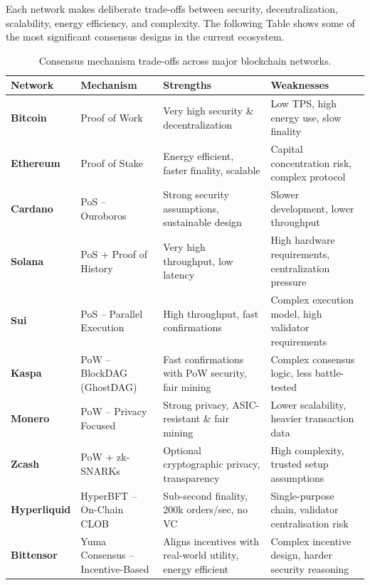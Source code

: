 \documentclass[12pt, a4paper, oneside]{report}
\theoremstyle{definition}
\begin{document}
Each network makes deliberate trade-offs between security, decentralization, 
scalability, energy efficiency, and complexity. The following Table shows some of the 
most significant consensus designs in the current ecosystem.\\[0.6cm]

\begin{table}[H]
\centering
\small
\renewcommand{\arraystretch}{1.6}
\begin{tabular}{p{2.8cm} p{3.2cm} p{4cm} p{4cm}}
\toprule
\textbf{Network} & \textbf{Mechanism} & \textbf{Strengths} & \textbf{Weaknesses} \\
\midrule

\textbf{Bitcoin} & Proof of Work &
Very high security \& decentralization &
Low TPS, high energy use, slow finality \\

\textbf{Ethereum} & Proof of Stake &
Energy efficient, faster finality, scalable &
Capital concentration risk, complex protocol \\

\textbf{Cardano} & PoS – Ouroboros &
Strong security assumptions, sustainable design &
Slower development, lower throughput \\

\textbf{Solana} & PoS + Proof of History &
Very high throughput, low latency &
High hardware requirements, centralization pressure \\

\textbf{Sui} & PoS – Parallel Execution &
High throughput, fast confirmations &
Complex execution model, high validator requirements \\

\textbf{Kaspa} & PoW – BlockDAG (GhostDAG) &
Fast confirmations with PoW security, fair mining &
Complex consensus logic, less battle-tested \\

\textbf{Monero} & PoW – Privacy Focused &
Strong privacy, ASIC-resistant \& fair mining &
Lower scalability, heavier transaction data \\

\textbf{Zcash} & PoW + zk-SNARKs &
Optional cryptographic privacy, transparency &
High complexity, trusted setup assumptions \\

\textbf{Hyperliquid} & HyperBFT – On-Chain CLOB &
Sub-second finality, 200k orders/sec, no VC &
Single-purpose chain, validator centralisation risk \\

\textbf{Bittensor} & Yuma Consensus – Incentive-Based &
Aligns incentives with real-world utility, energy efficient &
Complex incentive design, harder security reasoning \\

\bottomrule
\end{tabular}
\caption{Consensus mechanism trade-offs across major blockchain networks.}
\label{tab:consensus}
\end{table}
\end{document}
